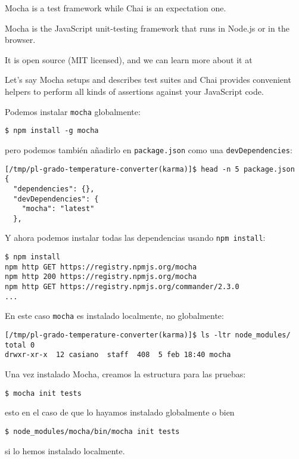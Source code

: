 \label{parrafo:mochaychai}
Mocha is a test framework while Chai is an expectation one. 

Mocha is the  JavaScript unit-testing framework
that runs in Node.js or in the browser. 

It is open source (MIT licensed),
and we can learn more about it at

Let's say
Mocha setups and describes test suites and Chai provides convenient
helpers to perform all kinds of assertions against your JavaScript code.


Podemos instalar \verb|mocha| globalmente:
\begin{verbatim}
$ npm install -g mocha
\end{verbatim}
pero podemos también añadirlo en \verb|package.json| como una \verb|devDependencies|:
\begin{verbatim}
[/tmp/pl-grado-temperature-converter(karma)]$ head -n 5 package.json 
{
  "dependencies": {},
  "devDependencies": {
    "mocha": "latest"
  },
\end{verbatim}

Y ahora podemos instalar todas las dependencias usando  \verb|npm install|:
\begin{verbatim}
$ npm install
npm http GET https://registry.npmjs.org/mocha
npm http 200 https://registry.npmjs.org/mocha
npm http GET https://registry.npmjs.org/commander/2.3.0
...
\end{verbatim}

En este caso \verb|mocha| es instalado localmente, no globalmente:
\begin{verbatim}
[/tmp/pl-grado-temperature-converter(karma)]$ ls -ltr node_modules/
total 0
drwxr-xr-x  12 casiano  staff  408  5 feb 18:40 mocha
\end{verbatim}

Una vez instalado Mocha, creamos la estructura para las pruebas:

\begin{verbatim}
$ mocha init tests
\end{verbatim}
esto en el caso de que lo hayamos instalado globalmente o bien
\begin{verbatim}
$ node_modules/mocha/bin/mocha init tests
\end{verbatim}
si lo hemos instalado localmente.

